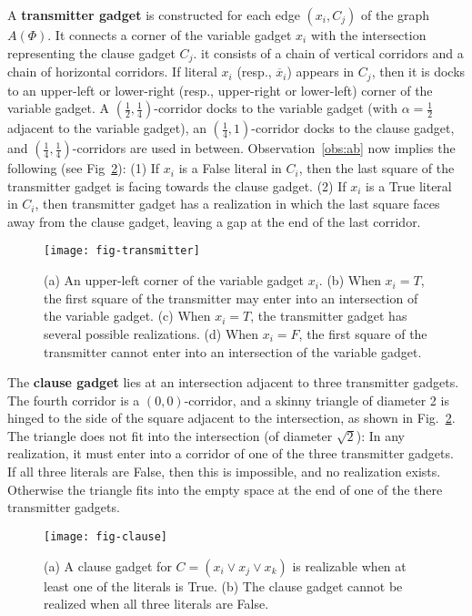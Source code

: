 \documentclass{llncs}
\begin{document}
A {\bf transmitter gadget} is constructed for each edge $(x_i,C_j)$ of the graph $A(\Phi)$.
It connects a corner of the variable gadget $x_i$ with the intersection representing the clause gadget $C_j$. it consists of a chain of vertical corridors and a chain of horizontal corridors. If literal $x_i$ (resp., $\overline{x}_i$) appears in $C_j$, then it is docks to an upper-left or lower-right (resp., upper-right or lower-left) corner of the variable gadget. A $(\frac{1}{2},\frac{1}{4})$-corridor docks to the variable gadget (with $\alpha=\frac{1}{2}$ adjacent to the variable gadget), an $(\frac{1}{4},1)$-corridor docks to the clause gadget, and $(\frac{1}{4},\frac{1}{4})$-corridors are used in between. Observation~\ref{obs:ab} now implies the following (see Fig~\ref{fig:clause}): (1) If $x_i$ is a {\sc False} literal in $C_i$, then the last square of the transmitter gadget is facing towards the clause gadget. (2) If $x_i$ is a {\sc True} literal in $C_i$, then transmitter gadget has a realization in which the last square faces away from the clause gadget, leaving a gap at the end of the last corridor.

\begin{figure}[htbp]
	\centering
	\texttt{[image: fig-transmitter]}
	\caption{(a) An upper-left corner of the variable gadget $x_i$.
(b) When $x_i=T$, the first square of the transmitter may enter into an intersection of the variable gadget.
(c) When $x_i=T$, the transmitter gadget has several possible realizations.
(d) When $x_i=F$, the first square of the transmitter cannot enter into an intersection of the variable gadget.}
	\label{fig:transmitter}
\end{figure}

The {\bf clause gadget} lies at an intersection adjacent to three transmitter gadgets. The fourth corridor is a $(0,0)$-corridor, and a skinny triangle of diameter 2 is hinged to the side of the
square adjacent to the intersection, as shown in Fig.~\ref{fig:clause}. The triangle does not fit into the intersection (of diameter $\sqrt{2}$): In any realization, it must enter into a corridor of one of the three transmitter gadgets. If all three literals are {\sc False}, then this
is impossible, and no realization exists. Otherwise the triangle fits
into the empty space at the end of one of the there transmitter gadgets.

\begin{figure}[htbp]
	\centering
	\texttt{[image: fig-clause]}
	\caption{(a) A clause gadget for $C=(x_i\lor x_j\lor x_k)$ is
realizable when at least one of the literals is {\sc True}.
(b) The clause gadget cannot be realized when all three literals are {\sc False}.}
	\label{fig:clause}
\end{figure}
\end{document}
